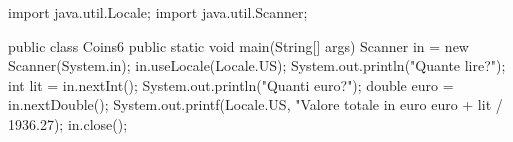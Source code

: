 \begin{unipdcode}[language=Java]
import java.util.Locale;
import java.util.Scanner;

public class Coins6 {
    public static void main(String[] args) {
        Scanner in = new Scanner(System.in);
        in.useLocale(Locale.US);
        System.out.println("Quante lire?");
        int lit = in.nextInt();
        System.out.println("Quanti euro?");
        double euro = in.nextDouble();
        System.out.printf(Locale.US, "Valore totale in euro %
                          euro + lit / 1936.27);
        in.close();
    }
}
\end{unipdcode}

